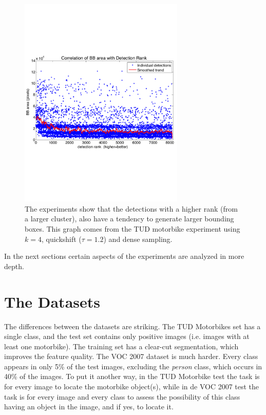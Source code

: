 \begin{figure}[hbt]
    \centering
    \includegraphics[width=0.7\textwidth]{BBSizeVsRank}
    \caption{The experiments show that the detections with a higher rank (from a larger cluster), also have a tendency to generate larger bounding boxes. This graph comes from the TUD motorbike experiment using $k=4$, quickshift ($\tau=1.2$) and dense sampling.}
    \label{fig:bbsizevsrank}
\end{figure}

In the next sections certain aspects of the experiments are analyzed in more depth.

\section{The Datasets} %
\label{sec:the_dataset}

The differences between the datasets are striking. The TUD Motorbikes set has a single class, and the test set contains only positive images (i.e. images with at least one motorbike). The training set has a clear-cut segmentation, which improves the feature quality. The VOC 2007 dataset is much harder. Every class appears in only 5\% of the test images, excluding the \emph{person} class, which occurs in 40\% of the images. To put it another way, in the TUD Motorbike test the task is for every image to locate the motorbike object(s), while in de VOC 2007 test the task is for every image and every class to assess the possibility of this class having an object in the image, and if yes, to locate it.

